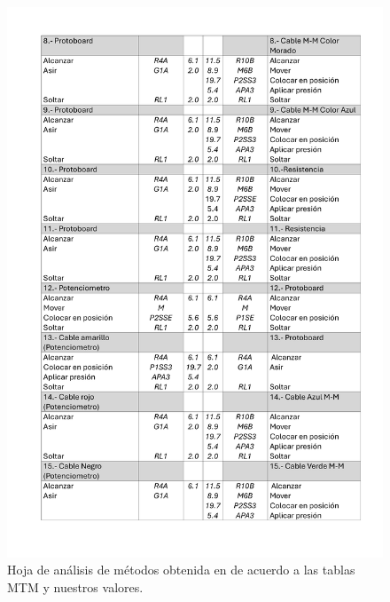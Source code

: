 \begin{figure}[H]
    \includegraphics[scale=0.2]{15/img/tablaMTM1-2.pdf}
    \caption{Hoja de análisis de métodos obtenida en de acuerdo a las tablas MTM y nuestros valores.}
    \label{fig:tablaMTM1-1}
    \end{figure}
